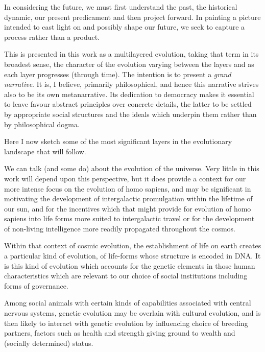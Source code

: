 In considering the future, we must first understand the past, the historical dynamic, our present predicament and then project forward.
In painting a picture intended to cast light on and possibly shape our future, we seek to capture a process rather than a product.

This is presented in this work as a multilayered evolution, taking that term in its broadest sense, the character of the evolution varying between the layers and as each layer progresses (through time).
The intention is to present a {\it grand narrative}.
It is, I believe, primarily philosophical, and hence this narrative strives also to be its own metanarrative.
Its dedication to democracy makes it essential to leave favour abstract principles over concrete details, the latter to be settled by appropriate social structures and the ideals which underpin them rather than by philosophical dogma.

Here I now sketch some of the most significant layers in the evolutionary landscape that will follow.

We can talk (and some do) about the evolution of the universe.
Very little in this work will depend upon this perspective, but it does provide a context for our more intense focus on the evolution of homo sapiens, and may be significant in motivating the development of intergalactic promulgation within the lifetime of our sun, and for the incentives which that might provide for evolution of homo sapiens into life forms more suited to intergalactic travel or for the development of non-living intelligence more readily propagated throughout the cosmos.

Within that context of cosmic evolution, the establishment of life on earth creates a particular kind of evolution, of life-forms whose structure is encoded in DNA.
It is this kind of evolution which accounts for the genetic elements in those human characteristics which are relevant to our choice of social institutions including forms of governance.

Among social animals with certain kinds of capabilities associated with central nervous systems, genetic evolution may be overlain with cultural evolution, and is then likely to interact with genetic evolution by influencing choice of breeding partners, factors such as health and strength giving ground to wealth and (socially determined) status.



